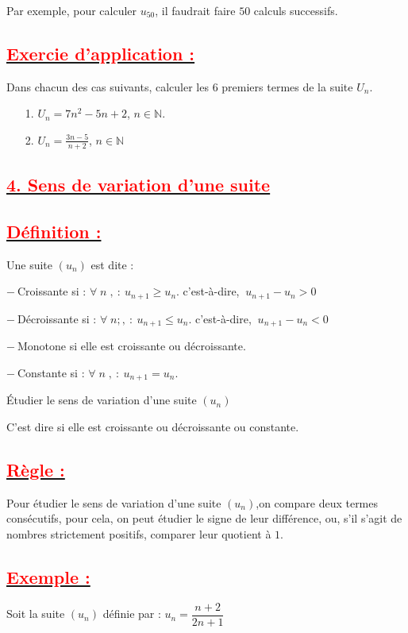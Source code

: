 \documentclass[12pt]{article}
\begin{document}
Par exemple, pour calculer $u_{50}$, il faudrait faire $50$ calculs successifs.
\subsection*{\underline{\textbf{\textcolor{red}{Exercie d'application :}}}}
Dans chacun des cas suivants, calculer les $6$ premiers termes de la suite $U_{n}$.
\begin{itemize}
\item[1.]$U_{n} = 7n^{2} - 5n + 2$, $n \in \mathbb{N}$.

\item[2.]$U_{n}=\frac{3n-5}{n+2}$, $n \in \mathbb{N}$
\end{itemize}
\subsection*{\underline{\textbf{\textcolor{red}{4. Sens de variation d'une suite}}}}
\subsection*{\underline{\textbf{\textcolor{red}{Définition :}}}}
	
Une suite $\left(u_{n}\right)$ est dite :
	
$-\ $Croissante si : $\forall\;n\;,\ :\ u_{n+1}\geq u_{n} .$ c'est-à-dire, $\ u_{n+1}- u_{n}>0$
	
$-\ $Décroissante si : $\forall\;n;,\ :\ u_{n+1}\leq u_{n}$. c'est-à-dire, $\ u_{n+1}- u_{n}<0$

$-\ $Monotone si elle est croissante ou décroissante.

$-\ $Constante si : $\forall\;n\;,\ :\ u_{n+1}=u_{n}.$

Étudier le sens de variation d'une suite $\left(u_{n}\right)$

C'est dire si elle est croissante ou décroissante ou constante.
\subsection*{\underline{\textbf{\textcolor{red}{Règle :}}}}
Pour étudier le sens de variation d'une suite $\left(u_{n}\right)$,on compare deux termes consécutifs, pour cela, on peut étudier le signe de leur différence, ou, s'il s'agit de nombres strictement positifs, comparer leur quotient à $1.$
\subsection*{\underline{\textbf{\textcolor{red}{Exemple :}}}}
Soit la suite $\left(u_{n}\right)$ définie par : $u_{n}=\dfrac{n+2}{2n+1}$
\end{document}
